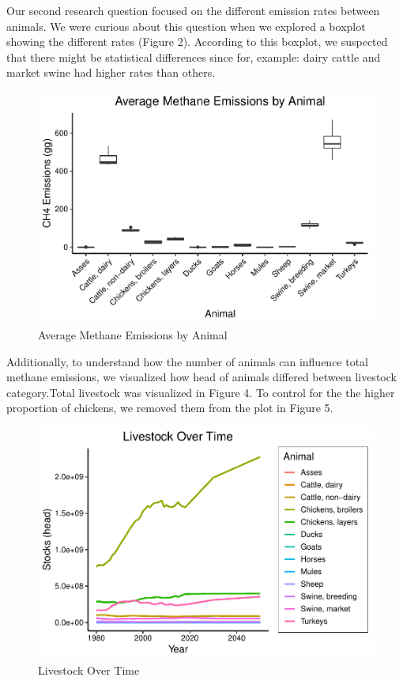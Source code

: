 \documentclass[
  12pt,
]{article}
\begin{document}
Our second research question focused on the different emission rates
between animals. We were curious about this question when we explored a
boxplot showing the different rates (Figure 2). According to this
boxplot, we suspected that there might be statistical differences since
for, example: dairy cattle and market swine had higher rates than
others.

\begin{figure}
\centering
\includegraphics{SultzerSwitFinalProject_files/figure-latex/viewing boxplot of methane by animal-1.pdf}
\caption{Average Methane Emissions by Animal}
\end{figure}

Additionally, to understand how the number of animals can influence
total methane emissions, we visualized how head of animals differed
between livestock category.Total livestock was visualized in Figure 4.
To control for the the higher proportion of chickens, we removed them
from the plot in Figure 5.

\begin{figure}
\centering
\includegraphics{SultzerSwitFinalProject_files/figure-latex/animal.head-1.pdf}
\caption{Livestock Over Time}
\end{figure}
\end{document}
